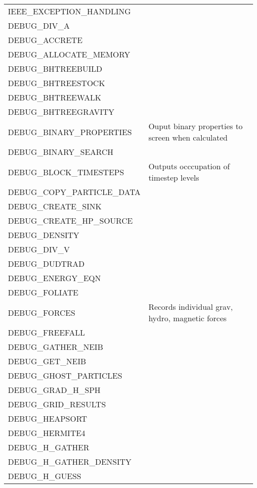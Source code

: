 \documentclass[a4paper]{article}
\begin{document}
\begin{center}
\begin{supertabular}{|p{6cm}|p{8cm}|}
IEEE\_EXCEPTION\_HANDLING   & \\
DEBUG\_DIV\_A               & \\
DEBUG\_ACCRETE              & \\
DEBUG\_ALLOCATE\_MEMORY     & \\
DEBUG\_BHTREEBUILD          & \\
DEBUG\_BHTREESTOCK          & \\
DEBUG\_BHTREEWALK           & \\
DEBUG\_BHTREEGRAVITY        & \\
DEBUG\_BINARY\_PROPERTIES   & Ouput binary properties to screen when calculated \\
DEBUG\_BINARY\_SEARCH       & \\
DEBUG\_BLOCK\_TIMESTEPS     & Outputs occcupation of timestep levels \\
DEBUG\_COPY\_PARTICLE\_DATA & \\
DEBUG\_CREATE\_SINK         & \\
DEBUG\_CREATE\_HP\_SOURCE   & \\
DEBUG\_DENSITY              & \\
DEBUG\_DIV\_V               & \\
DEBUG\_DUDTRAD              & \\
DEBUG\_ENERGY\_EQN          & \\
DEBUG\_FOLIATE              & \\
DEBUG\_FORCES               & Records individual grav, hydro, magnetic forces\\
DEBUG\_FREEFALL             & \\
DEBUG\_GATHER\_NEIB         & \\
DEBUG\_GET\_NEIB            & \\
DEBUG\_GHOST\_PARTICLES     & \\
DEBUG\_GRAD\_H\_SPH         & \\
DEBUG\_GRID\_RESULTS        & \\
DEBUG\_HEAPSORT             & \\
DEBUG\_HERMITE4             & \\
DEBUG\_H\_GATHER            & \\
DEBUG\_H\_GATHER\_DENSITY   & \\
DEBUG\_H\_GUESS             & \\

\end{supertabular}
\end{center}
\end{document}
